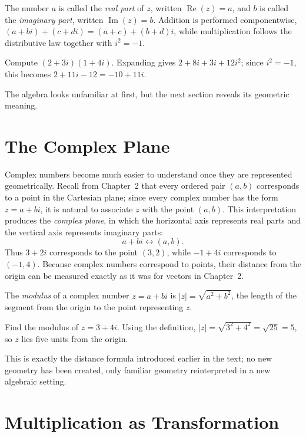 The number $a$ is called the \emph{real part} of $z$, written
$\operatorname{Re}(z) = a$, and $b$ is called the \emph{imaginary part},
written $\operatorname{Im}(z) = b$. Addition is performed componentwise,
$(a+bi)+(c+di) = (a+c)+(b+d)i$, while multiplication follows the
distributive law together with $i^2=-1$.

\begin{example}
Compute $(2+3i)(1+4i)$. Expanding gives $2+8i+3i+12i^2$; since $i^2=-1$,
this becomes $2+11i-12 = -10+11i$.
\end{example}

The algebra looks unfamiliar at first, but the next section reveals its
geometric meaning.

\section{The Complex Plane}

Complex numbers become much easier to understand once they are
represented geometrically. Recall from Chapter~2 that every ordered pair
$(a,b)$ corresponds to a point in the Cartesian plane; since every
complex number has the form $z=a+bi$, it is natural to associate $z$ with
the point $(a,b)$. This interpretation produces the \emph{complex plane},
in which the horizontal axis represents real parts and the vertical axis
represents imaginary parts:
\[
a+bi \longleftrightarrow (a,b).
\]
Thus $3+2i$ corresponds to the point $(3,2)$, while $-1+4i$ corresponds
to $(-1,4)$. Because complex numbers correspond to points, their distance
from the origin can be measured exactly as it was for vectors in
Chapter~2.

\begin{definition}
The \emph{modulus} of a complex number $z=a+bi$ is $|z| = \sqrt{a^2+b^2}$,
the length of the segment from the origin to the point representing $z$.
\end{definition}

\begin{example}
Find the modulus of $z=3+4i$. Using the definition, $|z| =
\sqrt{3^2+4^2} = \sqrt{25} = 5$, so $z$ lies five units from the origin.
\end{example}

This is exactly the distance formula introduced earlier in the text; no
new geometry has been created, only familiar geometry reinterpreted in a
new algebraic setting.

\section{Multiplication as Transformation}

